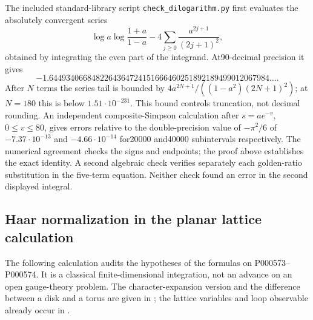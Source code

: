 \begin{remark}\oursComputed
The included standard-library script \texttt{check\_dilogarithm.py} first evaluates the absolutely convergent series
\[
 \log a\log\frac{1+a}{1-a}
       -4\sum_{j\ge0}\frac{a^{2j+1}}{(2j+1)^2},
\]
obtained by integrating the even part of the integrand. At90-decimal precision it gives
\[
 -1.6449340668482264364724151666460251892189499012067984\ldots.
\]
After \(N\) terms the series tail is bounded by
\(4a^{2N+1}/((1-a^2)(2N+1)^2)\); at \(N=180\) this is below \(1.51\cdot10^{-231}\). This bound controls truncation, not decimal rounding.
An independent composite-Simpson calculation after \(s=a e^{-v}\), \(0\le v\le80\), gives errors relative to the double-precision value of \(-\pi^2/6\) of \(-7.37\cdot10^{-13}\) and \(-4.66\cdot10^{-14}\) for20000 and40000 subintervals respectively. The numerical agreement checks the signs and endpoints; the proof above establishes the exact identity. A second algebraic check verifies separately each golden-ratio substitution in the five-term equation. Neither check found an error in the second displayed integral.
\end{remark}

\subsection{Haar normalization in the planar lattice calculation}
The following calculation audits the hypotheses of the formulas on P000573--P000574. It is a classical finite-dimensional integration, not an advance on an open gauge-theory problem. The character-expansion version and the difference between a disk and a torus are given in \citet[AppendixA]{hirasawa2020complex}; the lattice variables and loop observable already occur in \citet[\S\S II--III]{wilson1974confinement}.

